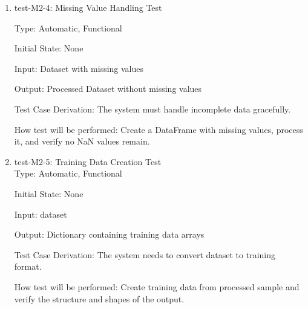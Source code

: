 \documentclass[12pt, titlepage]{article}
\begin{document}
\begin{enumerate}
  \item{test-M2-4: Missing Value Handling Test\\}
  
  Type: Automatic, Functional

  Initial State: None

  Input: Dataset with missing values

  Output: Processed Dataset without missing values

  Test Case Derivation: The system must handle incomplete data gracefully.

  How test will be performed: Create a DataFrame with missing values, process it, and verify no NaN values remain.

  \item{test-M2-5: Training Data Creation Test\\}
  Type: Automatic, Functional

  Initial State: None

  Input: dataset

  Output: Dictionary containing training data arrays

  Test Case Derivation: The system needs to convert dataset to training format.

  How test will be performed: Create training data from processed sample and verify the structure and shapes of the output.
\end{enumerate}
\end{document}
